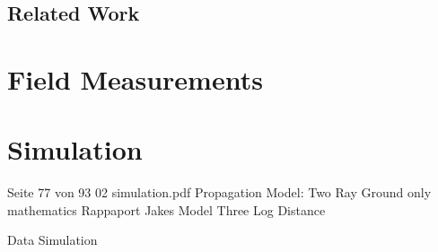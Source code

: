 \documentclass[]{nsm-thesis}
\begin{document}
\section{Related Work}





\chapter{Field Measurements}

\begin{comment}
	Netcat not working no interval but connection setup easy. maybe something else

iperf run unlimited?


\end{comment}







\begin{comment}
\chapter{Developed architecture / System design / Implementation / ...}

\begin{itemize}
\item describe everything you yourself did (as opposed to the fundamentals chapter, which explains what you built on)
\item start with a theoretical approach
\item describe the developed system/algorithm/method from a high-level point of view
\item go ahead in presenting your developments in more detail
\item recommended length: approximately one third of the thesis.
\end{itemize}
\end{comment}


\chapter{Simulation}
Seite 77 von 93 02 simulation.pdf
Propagation Model:
 Two Ray Ground only mathematics Rappaport
 Jakes Model
 Three Log Distance
 
 
 Data Simulation
 
 
 
\end{document}
